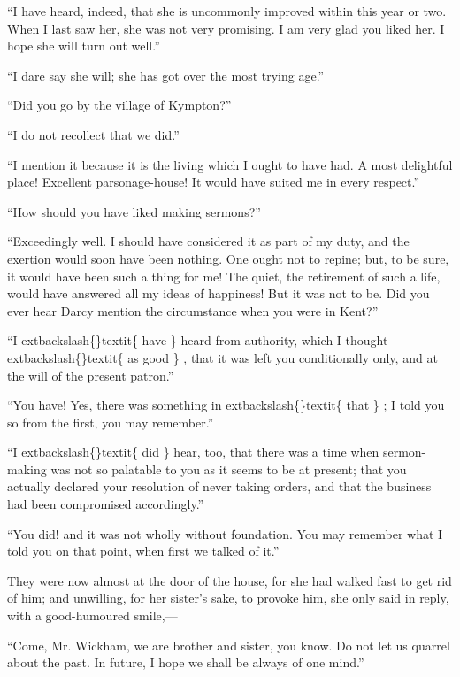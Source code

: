 \documentclass[10pt]{book}
\begin{document}
   “I have heard, indeed, that she is uncommonly improved within this year
or two. When I last saw her, she was not very promising. I am very glad
you liked her. I hope she will turn out well.”
  

   “I dare say she will; she has got over the most trying age.”
  

   “Did you go by the village of Kympton?”
  

   “I do not recollect that we did.”
  

   “I mention it because it is the living which I ought to have had. A most
delightful place! Excellent parsonage-house! It would have suited me in
every respect.”
  

   “How should you have liked making sermons?”
  

   “Exceedingly well. I should have considered it as part of my duty, and
the exertion would soon have been nothing. One ought not to repine; but,
to be sure, it would have been such a thing for me! The quiet, the
retirement of such a life, would have answered all my ideas of
happiness! But it was not to be. Did you ever hear Darcy mention the
circumstance when you were in Kent?”
  

   “I
   	extbackslash\{\}textit\{
    have
   \}
   heard from authority, which I thought
   	extbackslash\{\}textit\{
    as good
   \}
   ,
   that it was
left you conditionally only, and at the will of the present patron.”
  

   “You have! Yes, there was something in
   	extbackslash\{\}textit\{
    that
   \}
   ; I told you so from the
first, you may remember.”
  

   “I
   	extbackslash\{\}textit\{
    did
   \}
   hear, too, that there was a time when sermon-making was not so
palatable to you as it seems to be at present; that you actually
declared your resolution of never taking orders, and that the business
had been compromised accordingly.”
  

   “You did! and it was not wholly without foundation. You may remember
what I told you on that point, when first we talked of it.”
  

   They were now almost at the door of the house, for she had walked fast
to get rid of him; and unwilling, for her sister’s sake, to provoke him,
she only said in reply, with a good-humoured smile,—
  

   “Come, Mr. Wickham, we are brother and sister, you know. Do not let us
quarrel about the past. In future, I hope we shall be always of one
mind.”
  
\end{document}
